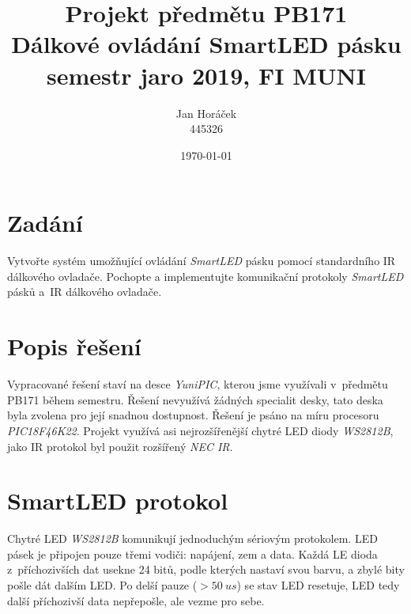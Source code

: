 \documentclass[12pt,a4paper]{article}
\begin{document}
\setcounter{page}{1}  %

\title{\normalsize Projekt předmětu PB171 \\ \huge Dálkové ovládání SmartLED pásku
\\ \normalsize semestr jaro 2019, FI MUNI}
\author{Jan Horáček\\ 445326}
\date{\today}
\maketitle

\setlength{\parindent}{0cm}
\setlength{\parskip}{3mm plus2pt minus2pt}

\section{Zadání}

Vytvořte systém umožňující ovládání \textit{SmartLED} pásku pomocí standardního
IR dálkového ovladače. Pochopte a implementujte komunikační protokoly
\textit{SmartLED} pásků a~IR dálkového ovladače.

\section{Popis řešení}

Vypracované řešení staví na desce \textit{YuniPIC}, kterou jsme využívali
v~předmětu PB171 během semestru. Řešení nevyužívá žádných specialit desky,
tato deska byla zvolena pro její snadnou dostupnost. Řešení je psáno na míru
procesoru \textit{PIC18F46K22}. Projekt využívá asi nejrozšířenější chytré LED
diody \textit{WS2812B}, jako IR protokol byl použit rozšířený \textit{NEC IR}.

\section{SmartLED protokol}

Chytré LED \textit{WS2812B} komunikují jednoduchým sériovým protokolem.
LED pásek je připojen pouze třemi vodiči: napájení, zem a data. Každá LE dioda
z~příchozivších dat usekne 24 bitů, podle kterých nastaví svou barvu, a zbylé
bity pošle dát dalším LED. Po delší pauze ($> 50\ us$) se stav LED resetuje,
LED tedy další příchozivší data nepřepošle, ale vezme pro sebe.
\end{document}
